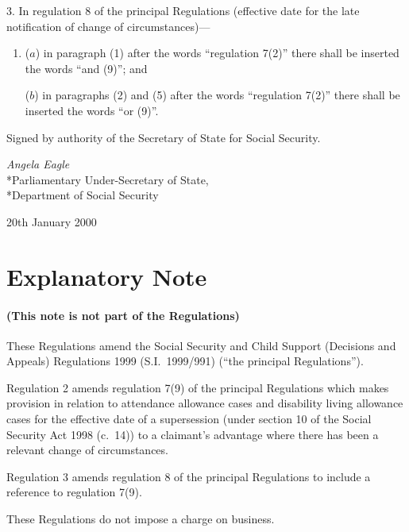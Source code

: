 \documentclass[12pt,a4paper]{article}
\begin{document}
3.  In regulation 8 of the principal Regulations (effective date for the late notification of change of circumstances)—
\begin{enumerate}\item[]
($a$) in paragraph (1) after the words “regulation 7(2)” there shall be inserted the words “and (9)”; and

($b$) in paragraphs (2) and (5) after the words “regulation 7(2)” there shall be inserted the words “or (9)”. 
\end{enumerate}

\bigskip

Signed 
by authority of the Secretary of State for Social Security.

{\raggedleft
\emph{Angela Eagle
}\\*Parliamentary Under-Secretary of State,\\*Department of Social Security

}

20th January 2000

\small

\part{Explanatory Note}

\renewcommand\parthead{--- Explanatory Note}

\subsection*{(This note is not part of the Regulations)}

These Regulations amend the Social Security and Child Support (Decisions and Appeals) Regulations 1999 (S.I.\ 1999/991) (“the principal Regulations”).

Regulation 2 amends regulation 7(9) of the principal Regulations which makes provision in relation to attendance allowance cases and disability living allowance cases for the effective date of a supersession (under section 10 of the Social Security Act 1998 (c.\ 14)) to a claimant’s advantage where there has been a relevant change of circumstances.

Regulation 3 amends regulation 8 of the principal Regulations to include a reference to regulation 7(9).

These Regulations do not impose a charge on business. 
\end{document}
